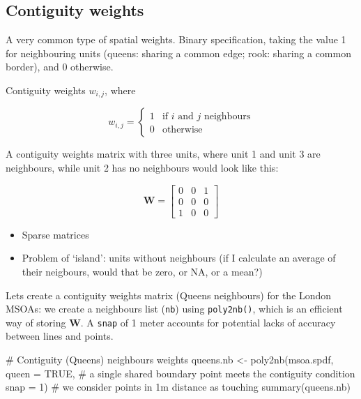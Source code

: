 \documentclass[
  letterpaper,
  DIV=11,
  numbers=noendperiod]{scrreprt}
\newenvironment{Shaded}{\begin{snugshade}}{\end{snugshade}}
\newcommand{\AttributeTok}[1]{\textcolor[rgb]{0.40,0.45,0.13}{#1}}
\newcommand{\CommentTok}[1]{\textcolor[rgb]{0.37,0.37,0.37}{#1}}
\newcommand{\ConstantTok}[1]{\textcolor[rgb]{0.56,0.35,0.01}{#1}}
\newcommand{\DecValTok}[1]{\textcolor[rgb]{0.68,0.00,0.00}{#1}}
\newcommand{\FunctionTok}[1]{\textcolor[rgb]{0.28,0.35,0.67}{#1}}
\newcommand{\NormalTok}[1]{\textcolor[rgb]{0.00,0.23,0.31}{#1}}
\newcommand{\OtherTok}[1]{\textcolor[rgb]{0.00,0.23,0.31}{#1}}
\begin{document}
\hypertarget{contiguity-weights}{%
\subsection{Contiguity weights}\label{contiguity-weights}}

A very common type of spatial weights. Binary specification, taking the
value 1 for neighbouring units (queens: sharing a common edge; rook:
sharing a common border), and 0 otherwise.

Contiguity weights \(w_{i,j}\), where

\begin{equation}
  w_{i,j} =
    \begin{cases}
      1 & \text{if $i$ and $j$ neighbours}\\
      0 & \text{otherwise}
    \end{cases}       
\end{equation}

A contiguity weights matrix with three units, where unit 1 and unit 3
are neighbours, while unit 2 has no neighbours would look like this:

\[
        \begin{equation} 
        \boldsymbol{\mathbf{W}}  = \begin{bmatrix} 
            0 & 0 & 1  \\
            0 & 0 & 0  \\
            1 & 0 & 0  
            \end{bmatrix}   \nonumber
        \end{equation}
\]

\begin{itemize}
\item
  Sparse matrices
\item
  Problem of `island': units without neighbours (if I calculate an
  average of their neigbours, would that be zero, or NA, or a mean?)
\end{itemize}

Lets create a contiguity weights matrix (Queens neighbours) for the
London MSOAs: we create a neighbours list (\texttt{nb}) using
\texttt{poly2nb()}, which is an efficient way of storing
\({\boldsymbol{\mathbf{W}}}\). A \texttt{snap} of 1 meter accounts for
potential lacks of accuracy between lines and points.

\begin{Shaded}
\begin{Highlighting}[]
\CommentTok{\# Contiguity (Queens) neighbours weights}
\NormalTok{queens.nb }\OtherTok{\textless{}{-}} \FunctionTok{poly2nb}\NormalTok{(msoa.spdf, }
                     \AttributeTok{queen =} \ConstantTok{TRUE}\NormalTok{, }\CommentTok{\# a single shared boundary point meets the contiguity condition}
                     \AttributeTok{snap =} \DecValTok{1}\NormalTok{) }\CommentTok{\# we consider points in 1m distance as \textquotesingle{}touching\textquotesingle{}}
\FunctionTok{summary}\NormalTok{(queens.nb)}
\end{Highlighting}
\end{Shaded}
\end{document}
